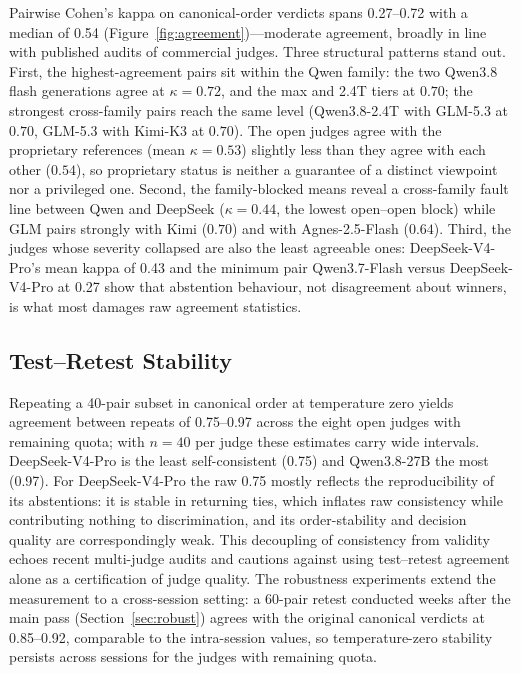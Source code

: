 \documentclass[review,12pt]{elsarticle}
\begin{document}
Pairwise Cohen's kappa on canonical-order verdicts spans 0.27--0.72 with a
median of 0.54 (Figure~\ref{fig:agreement})---moderate agreement, broadly
in line with published audits of commercial judges. Three structural
patterns stand out. First, the highest-agreement pairs sit within the Qwen
family: the two Qwen3.8 flash generations agree at $\kappa=0.72$, and the
max and 2.4T tiers at $0.70$; the strongest cross-family pairs reach the
same level (Qwen3.8-2.4T with GLM-5.3 at $0.70$, GLM-5.3 with Kimi-K3 at
$0.70$). The open judges agree with the proprietary references (mean
$\kappa=0.53$) slightly less than they agree with each other ($0.54$), so
proprietary status is neither a guarantee of a distinct viewpoint nor a
privileged one. Second, the family-blocked means reveal a cross-family
fault line between Qwen and DeepSeek ($\kappa=0.44$, the lowest open--open
block) while GLM pairs strongly with Kimi ($0.70$) and with
Agnes-2.5-Flash ($0.64$). Third, the judges whose severity collapsed are
also the least agreeable ones: DeepSeek-V4-Pro's mean kappa of 0.43 and
the minimum pair Qwen3.7-Flash versus DeepSeek-V4-Pro at 0.27 show that
abstention behaviour, not disagreement about winners, is what most damages
raw agreement statistics.

\subsection{Test--Retest Stability}
\label{sec:res-retest}

Repeating a 40-pair subset in canonical order at temperature zero yields
agreement between repeats of 0.75--0.97 across the eight open judges with
remaining quota; with $n=40$ per judge these estimates carry wide
intervals. DeepSeek-V4-Pro is the least self-consistent (0.75) and
Qwen3.8-27B the most (0.97). For DeepSeek-V4-Pro the raw 0.75 mostly
reflects the reproducibility of its abstentions: it is stable in returning
ties, which inflates raw consistency while contributing nothing to
discrimination, and its order-stability and decision quality are
correspondingly weak. This decoupling of consistency from validity echoes
recent multi-judge audits and cautions against using test--retest
agreement alone as a certification of judge quality. The robustness
experiments extend the measurement to a cross-session setting: a 60-pair
retest conducted weeks after the main pass (Section~\ref{sec:robust})
agrees with the original canonical verdicts at 0.85--0.92, comparable to
the intra-session values, so temperature-zero stability persists across
sessions for the judges with remaining quota.
\end{document}
